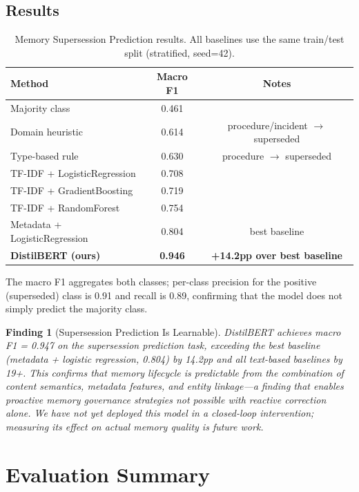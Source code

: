 \documentclass[11pt]{article}
\newtheorem{finding}{Finding}
\begin{document}
\subsection{Results}

\begin{table}[h]
\centering
\caption{Memory Supersession Prediction results. All baselines use the same train/test split (stratified, seed=42).}
\label{tab:supersession}
\begin{tabular}{lcc}
\toprule
Method & Macro F1 & Notes \\
\midrule
Majority class & 0.461 & \\
Domain heuristic & 0.614 & procedure/incident $\to$ superseded \\
Type-based rule & 0.630 & procedure $\to$ superseded \\
TF-IDF + LogisticRegression & 0.708 & \\
TF-IDF + GradientBoosting & 0.719 & \\
TF-IDF + RandomForest & 0.754 & \\
Metadata + LogisticRegression & 0.804 & best baseline \\
\midrule
\textbf{DistilBERT (ours)} & \textbf{0.946} & \textbf{+14.2pp over best baseline} \\
\bottomrule
\end{tabular}
\end{table}

The macro F1 aggregates both classes; per-class precision for the positive (superseded) class is 0.91 and recall is 0.89, confirming that the model does not simply predict the majority class. 

\begin{finding}[Supersession Prediction Is Learnable]
DistilBERT achieves macro F1 = 0.947 on the supersession prediction task, exceeding the best baseline (metadata + logistic regression, 0.804) by 14.2pp and all text-based baselines by 19+. This confirms that memory lifecycle is predictable from the combination of content semantics, metadata features, and entity linkage---a finding that enables proactive memory governance strategies not possible with reactive correction alone. We have not yet deployed this model in a closed-loop intervention; measuring its effect on actual memory quality is future work.
\end{finding}





\section{Evaluation Summary}
\end{document}
